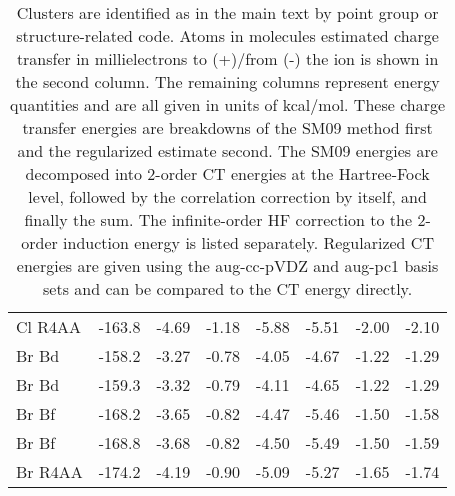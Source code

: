 \begin{table}
\begin{center}
\begin{tabular}{lrrrrrrr}
     Cl\sur{-} R4AA            &-163.8 & -4.69 & -1.18 & -5.88 & -5.51 & -2.00 & -2.10 \tabularnewline 
     Br\sur{-} Bd              &-158.2 & -3.27 & -0.78 & -4.05 & -4.67 & -1.22 & -1.29 \tabularnewline
     Br\sur{-} Bd\sur{\prime}  &-159.3 & -3.32 & -0.79 & -4.11 & -4.65 & -1.22 & -1.29 \tabularnewline
     Br\sur{-} Bf              &-168.2 & -3.65 & -0.82 & -4.47 & -5.46 & -1.50 & -1.58 \tabularnewline
     Br\sur{-} Bf\sur{\prime}  &-168.8 & -3.68 & -0.82 & -4.50 & -5.49 & -1.50 & -1.59 \tabularnewline   
     Br\sur{-} R4AA            &-174.2 & -4.19 & -0.90 & -5.09 & -5.27 & -1.65 & -1.74 \tabularnewline
    \hline 
    \hline
   \end{tabular}
  \end{center}
  \caption[Charge transfer and energies for ion/water clusters with \emph{n} = 6]{\label{tab:6_clusters} Clusters are identified as
  in the main text by point group or structure-related code. Atoms in molecules
  estimated charge transfer in millielectrons to (+)/from (-) the ion is shown in the second column. The remaining columns represent energy
  quantities and are all given in units of kcal/mol. These charge transfer energies are breakdowns of the SM09 method first and the regularized
  estimate second. The SM09 energies are decomposed into 2-order CT energies at the Hartree-Fock level, followed by the correlation 
  correction by itself, and finally the sum. The infinite-order HF correction to the 2-order induction energy is listed separately.
  Regularized CT energies are given using the aug-cc-pVDZ and aug-pc1 basis sets and can be compared to the CT energy directly.}
 \end{table}

\restoregeometry

